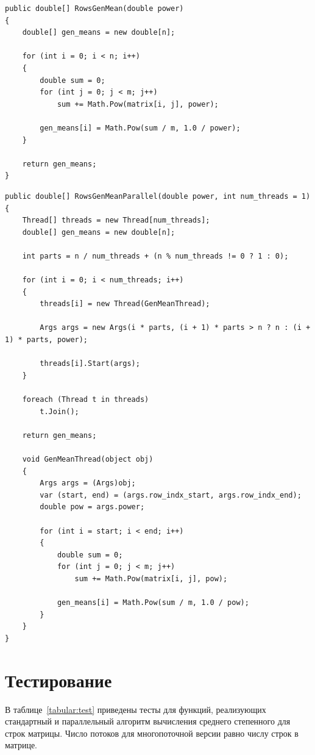 \documentclass[12pt]{report}
\begin{document}
\captionsetup{singlelinecheck = false, justification=raggedright}
\begin{lstlisting}[label=base_code,caption=Стандартный метод вычисления среднего степенного для строк матрицы]
public double[] RowsGenMean(double power)
{
	double[] gen_means = new double[n];
	
	for (int i = 0; i < n; i++)
	{
		double sum = 0;
		for (int j = 0; j < m; j++)
			sum += Math.Pow(matrix[i, j], power);
		
		gen_means[i] = Math.Pow(sum / m, 1.0 / power);
	}
	
	return gen_means;
}
\end{lstlisting}
\newpage
\begin{lstlisting}[label=vin_code,caption=Параллельный метод вычисления среднего степенного для строк матрицы]
public double[] RowsGenMeanParallel(double power, int num_threads = 1)
{
	Thread[] threads = new Thread[num_threads];
	double[] gen_means = new double[n];
	
	int parts = n / num_threads + (n % num_threads != 0 ? 1 : 0);
	
	for (int i = 0; i < num_threads; i++)
	{
		threads[i] = new Thread(GenMeanThread);
		
		Args args = new Args(i * parts, (i + 1) * parts > n ? n : (i + 1) * parts, power);
		
		threads[i].Start(args);
	}
	
	foreach (Thread t in threads)
		t.Join();
	
	return gen_means;
	
	void GenMeanThread(object obj)
	{
		Args args = (Args)obj;
		var (start, end) = (args.row_indx_start, args.row_indx_end);
		double pow = args.power;
		
		for (int i = start; i < end; i++)
		{
			double sum = 0;
			for (int j = 0; j < m; j++)
				sum += Math.Pow(matrix[i, j], pow);
			
			gen_means[i] = Math.Pow(sum / m, 1.0 / pow);
		}
	}
}
\end{lstlisting}
\captionsetup{singlelinecheck = false, justification=centering}

\newpage

\section{Тестирование}

В таблице~\ref{tabular:test} приведены тесты для функций, реализующих стандартный и параллельный алгоритм вычисления среднего степенного для строк матрицы. Число потоков для многопоточной версии равно числу строк в матрице.
\end{document}
